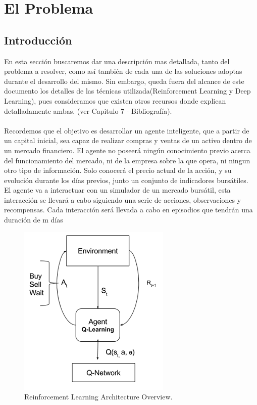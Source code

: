 \chapter{El Problema}


\section{Introducción}

En esta sección buscaremos dar una descripción mas detallada, tanto del problema a resolver, como así también de cada una de las soluciones adoptas durante el desarrollo del mismo. Sin embargo, queda fuera del alcance de
este documento los detalles de las técnicas utilizada(Reinforcement Learning y Deep Learning), pues consideramos que existen otros recursos donde explican detalladamente ambas. (ver Capitulo 7 - Bibliografía).
\\\\
Recordemos que el objetivo es desarrollar un agente inteligente, que a partir de un capital inicial, sea capaz de realizar compras y ventas de un activo dentro de un mercado financiero. El agente no poseerá ningún conocimiento previo acerca del funcionamiento del mercado, ni de la empresa sobre la que opera, ni ningun otro tipo de información. Solo conocerá el precio actual de la acción, y su evolución durante los días previos, junto un conjunto de indicadores bursátiles. 
\\
El agente va a interactuar con un simulador de un mercado bursátil, esta interacción se llevará a cabo siguiendo una serie de acciones, observaciones y recompensas.
Cada interacción será llevada a cabo en episodios que tendrán una duración de m días
\\

\begin{figure}[h!]
	\includegraphics[scale=0.5]{imagenes/deepRLOverview.png}
	\caption{Reinforcement Learning Architecture Overview.}
\end{figure}



